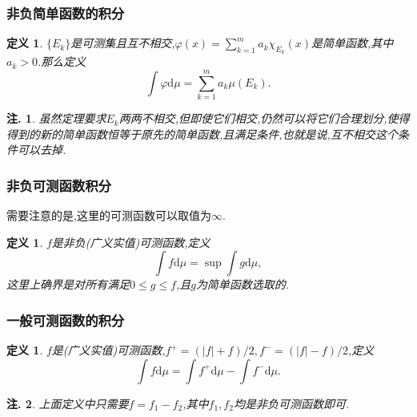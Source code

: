 \documentclass[12pt,a4paper,oneside]{ctexart}
\theoremstyle{nonumberplain}
\theoremstyle{plain}
\theoremstyle{plain}
\theoremstyle{nonumberplain}
\newtheorem{remark}{注.}
\theoremstyle{plain}
\theoremstyle{plain}
\newtheorem{definition}[theorem]{定义}
\theoremstyle{plain}
\theoremstyle{plain}
\newcommand{\dif}{\mathrm{d}}
\renewcommand{\phi}{\varphi}
\begin{document}
    \subsubsection{非负简单函数的积分}

    \begin{definition}
        \label{def:非负简单函数积分}
        $\{E_k\}$是可测集且互不相交,$\phi(x)=\sum_{k=1}^ma_k\chi_{E_k}(x)$是简单函数,其中$a_k> 0$.那么定义
        \begin{equation*}
            \int\phi\dif\mu=\sum_{k=1}^ma_k\mu(E_k).
        \end{equation*}
    \end{definition}
    \begin{remark}
        虽然定理要求$E_k$两两不相交,但即使它们相交,仍然可以将它们合理划分,使得得到的新的简单函数恒等于原先的简单函数,且满足条件,也就是说,互不相交这个条件可以去掉.
    \end{remark}

    \subsubsection{非负可测函数积分}
    需要注意的是,这里的可测函数可以取值为$\infty$.
    \begin{definition}
        \label{def:非负可测函数的积分}
        $f$是非负(广义实值)可测函数,定义
        \begin{equation*}
            \int f\dif \mu=\sup\int g\dif \mu,
        \end{equation*}
        这里上确界是对所有满足$0\leqslant g\leqslant f$,且$g$为简单函数选取的.
    \end{definition}

    \subsubsection{一般可测函数的积分}
    \begin{definition}
        \label{def:一般可测函数的积分}
        $f$是(广义实值)可测函数,$f^+=(|f|+f)/2,f^-=(|f|-f)/2$,定义 
        \begin{equation*}
            \int f\dif\mu=\int f^+\dif\mu-\int f^-\dif\mu.
        \end{equation*}
    \end{definition}
    \begin{remark}
        上面定义中只需要$f=f_1-f_2$,其中$f_1,f_2$均是非负可测函数即可.
    \end{remark}
\end{document}
